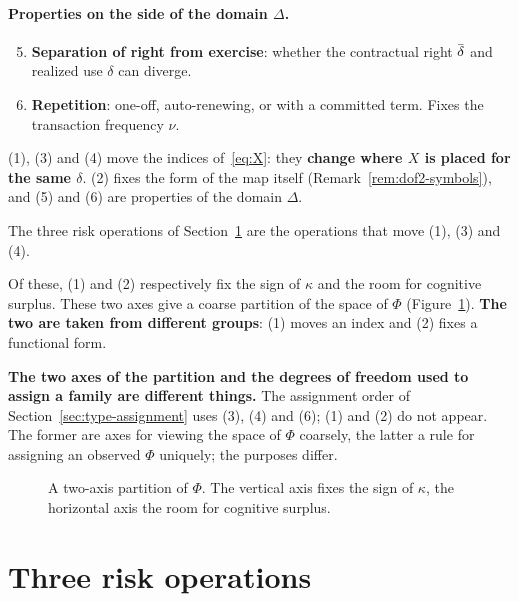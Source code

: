 \paragraph{Properties on the side of the domain \texorpdfstring{$\Delta$}{Delta}.}
\begin{enumerate}[label=(\arabic*)]
\setcounter{enumi}{4}
\item \textbf{Separation of right from exercise}: whether the contractual right $\dbar$ and realized use $\delta$ can diverge.
\item \textbf{Repetition}: one-off, auto-renewing, or with a committed term. Fixes the transaction frequency $\nu$.
\end{enumerate}

\begin{remark}
\label{rem:dof-groups}
(1), (3) and (4) move the indices of~\eqref{eq:X}: they \textbf{change where $X$ is placed
for the same $\delta$}. (2) fixes the form of the map itself
(Remark~\ref{rem:dof2-symbols}), and (5) and (6) are properties of the domain $\Delta$.

The three risk operations of Section~\ref{sec:three-ops} are the operations that move
(1), (3) and (4).
\end{remark}

Of these, (1) and (2) respectively fix the sign of $\kappa$ and the room for cognitive
surplus. These two axes give a coarse partition of the space of $\Phi$
(Figure~\ref{fig:quadrant}). \textbf{The two are taken from different groups}: (1) moves an
index and (2) fixes a functional form.

\textbf{The two axes of the partition and the degrees of freedom used to assign a family
are different things.} The assignment order of Section~\ref{sec:type-assignment} uses (3),
(4) and (6); (1) and (2) do not appear. The former are axes for viewing the space of $\Phi$
coarsely, the latter a rule for assigning an observed $\Phi$ uniquely; the purposes differ.

\begin{figure}[htbp]
\centering
{}
\caption{A two-axis partition of $\Phi$. The vertical axis fixes the sign of $\kappa$, the horizontal axis the room for cognitive surplus.}
\label{fig:quadrant}
\end{figure}

\section{Three risk operations}
\label{sec:three-ops}

